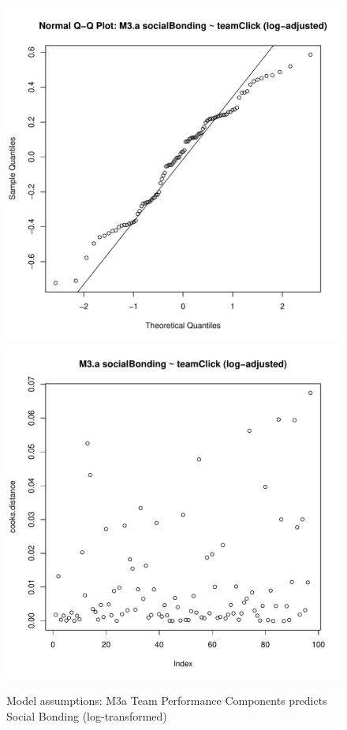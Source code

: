 {\begin{figure}[htbp]
        \includegraphics[scale =.4]{images/MLM3aLogQQNorm.pdf}
        \includegraphics[scale =.4]{images/MLM3aLogCooksD.pdf}
        \caption{Model assumptions: M3a Team Performance Components predicts Social Bonding (log-transformed)}
        \label{fig:MLM3aLogAssumptions}
      \end{figure}







}
